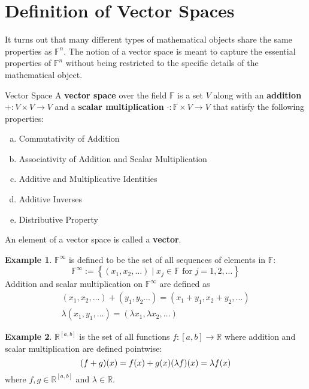 \documentclass{book}
\newcommand{\real}{\mathbb{R}}
\newcommand{\field}{\mathbb{F}}
\newcommand{\set}[2]{\left\{#1\;\vert\;#2\right\}}
\theoremstyle{definition}
\newtheorem*{example}{Example}
\begin{document}
\section{Definition of Vector Spaces}
It turns out that many different types of mathematical objects share the same
properties as $\field^n$. The notion of a vector space is meant to capture the
essential properties of $\field^n$ without being restricted to the specific
details of the mathematical object.

\begin{definition}{Vector Space}
    A \textbf{vector space} over the field $\field$ is a set $V$ along with an
    \textbf{addition} $+:V\times V \to V$ and a \textbf{scalar multiplication}
    $\cdot:\field \times V \to V$ that satisfy the following properties:
    \begin{enumerate}[(a)]
        \item Commutativity of Addition
        \item Associativity of Addition and Scalar Multiplication
        \item Additive and Multiplicative Identities
        \item Additive Inverses
        \item Distributive Property
    \end{enumerate}
    An element of a vector space is called a \textbf{vector}.
\end{definition}

\begin{example}
    $\field^{\infty}$ is defined to be the set of all sequences of elements in
    $\field$:
    \[
        \field^{\infty}:= \set{(x_1,x_2,\dots)}{x_j\in\field\text{ for }
        j=1,2,\dots}
    \]
    Addition and scalar multiplication on $\field^{\infty}$ are defined as
    \begin{gather*}
        (x_1,x_2,\dots)+(y_1,y_2\dots) = (x_1+y_1,x_2+y_2,\dots) \\
        \lambda(x_1,y_1,\dots) = (\lambda x_1, \lambda x_2,\dots)
    \end{gather*}
\end{example}

\begin{example}
    $\real^{[a,b]}$ is the set of all functions $f:[a,b]\to\real$ where addition
    and scalar multiplication are defined pointwise:
    \[
        (f+g)(x) = f(x)+g(x) \\
        (\lambda f)(x) = \lambda f(x)
    \]
    where $f,g \in \real^{[a,b]}$ and $\lambda\in\real$.
\end{example}
\end{document}
